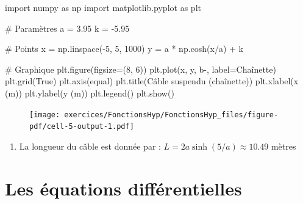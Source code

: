 \documentclass[
  12pt,
  letterpaper,
]{book}
\newenvironment{Shaded}{}{}
\newcommand{\CommentTok}[1]{\textcolor[rgb]{0.42,0.45,0.49}{#1}}
\newcommand{\DecValTok}[1]{\textcolor[rgb]{0.00,0.36,0.77}{#1}}
\newcommand{\FloatTok}[1]{\textcolor[rgb]{0.00,0.36,0.77}{#1}}
\newcommand{\ImportTok}[1]{\textcolor[rgb]{0.01,0.18,0.38}{#1}}
\newcommand{\NormalTok}[1]{\textcolor[rgb]{0.14,0.16,0.18}{#1}}
\newcommand{\OperatorTok}[1]{\textcolor[rgb]{0.14,0.16,0.18}{#1}}
\newcommand{\StringTok}[1]{\textcolor[rgb]{0.01,0.18,0.38}{#1}}
\newcommand{\VariableTok}[1]{\textcolor[rgb]{0.89,0.38,0.04}{#1}}
\providecommand{\tightlist}{%
  \setlength{\itemsep}{0pt}\setlength{\parskip}{0pt}}\usepackage{longtable,booktabs,array}
\theoremstyle{remark}
\begin{document}
\begin{Shaded}
\begin{Highlighting}[]
\ImportTok{import}\NormalTok{ numpy }\ImportTok{as}\NormalTok{ np}
\ImportTok{import}\NormalTok{ matplotlib.pyplot }\ImportTok{as}\NormalTok{ plt}

\CommentTok{\# Paramètres}
\NormalTok{a }\OperatorTok{=} \FloatTok{3.95}
\NormalTok{k }\OperatorTok{=} \OperatorTok{{-}}\FloatTok{5.95}

\CommentTok{\# Points}
\NormalTok{x }\OperatorTok{=}\NormalTok{ np.linspace(}\OperatorTok{{-}}\DecValTok{5}\NormalTok{, }\DecValTok{5}\NormalTok{, }\DecValTok{1000}\NormalTok{)}
\NormalTok{y }\OperatorTok{=}\NormalTok{ a }\OperatorTok{*}\NormalTok{ np.cosh(x}\OperatorTok{/}\NormalTok{a) }\OperatorTok{+}\NormalTok{ k}

\CommentTok{\# Graphique}
\NormalTok{plt.figure(figsize}\OperatorTok{=}\NormalTok{(}\DecValTok{8}\NormalTok{, }\DecValTok{6}\NormalTok{))}
\NormalTok{plt.plot(x, y, }\StringTok{\textquotesingle{}b{-}\textquotesingle{}}\NormalTok{, label}\OperatorTok{=}\StringTok{\textquotesingle{}Chaînette\textquotesingle{}}\NormalTok{)}
\NormalTok{plt.grid(}\VariableTok{True}\NormalTok{)}
\NormalTok{plt.axis(}\StringTok{\textquotesingle{}equal\textquotesingle{}}\NormalTok{)}
\NormalTok{plt.title(}\StringTok{\textquotesingle{}Câble suspendu (chaînette)\textquotesingle{}}\NormalTok{)}
\NormalTok{plt.xlabel(}\StringTok{\textquotesingle{}x (m)\textquotesingle{}}\NormalTok{)}
\NormalTok{plt.ylabel(}\StringTok{\textquotesingle{}y (m)\textquotesingle{}}\NormalTok{)}
\NormalTok{plt.legend()}
\NormalTok{plt.show()}
\end{Highlighting}
\end{Shaded}

\begin{figure}[H]

{\centering \texttt{[image: exercices/FonctionsHyp/FonctionsHyp\_files/figure-pdf/cell-5-output-1.pdf]}

}

\end{figure}

\begin{enumerate}
\def\labelenumi{\alph{enumi})}
\setcounter{enumi}{1}
\tightlist
\item
  La longueur du câble est donnée par :
  \(L = 2a \sinh(5/a) \approx 10.49\) mètres
\end{enumerate}

\hypertarget{les-uxe9quations-diffuxe9rentielles}{%
\chapter{Les équations
différentielles}\label{les-uxe9quations-diffuxe9rentielles}}
\end{document}
